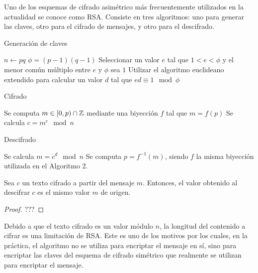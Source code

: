 Uno de los esquemas de cifrado asimétrico más frecuentemente utilizados en la actualidad se conoce como RSA. Consiste en tres algoritmos: uno para generar las claves, otro para el cifrado de mensajes, y otro para el descifrado.

\begin{algorithm}
	\caption{Generación de claves}\label{alg:1}
	$n \gets pq$ 
	$\phi = (p - 1)(q - 1)$\;
	Seleccionar un valor $e$ tal que $1 < e < \phi$ y el menor común múltiplo entre $e$ y $\phi$ sea $1$\;
	Utilizar el algoritmo euclideano extendido para calcular un valor $d$ tal que $ed \equiv 1 \mod \phi$\;
\end{algorithm}

\begin{algorithm}
	\caption{Cifrado}\label{alg:2}
	Se computa $m \in [0, p) \cap \mathbb{Z}$ mediante una biyección $f$ tal que $m = f(p)$\;
	Se calcula $c = m^e \mod n$\;
\end{algorithm}

\begin{algorithm}
	\caption{Descifrado}\label{alg:3}
	Se calcula $m = c^d \mod n$\;
	Se computa $p = f^{-1}(m)$, siendo $f$ la misma biyección utilizada en el Algoritmo 2.
\end{algorithm}

\newpage

\begin{theorem}
	Sea $c$ un texto cifrado a partir del mensaje $m$. Entonces, el valor obtenido al descifrar $c$ es el mismo valor $m$ de origen.
\end{theorem}

\begin{proof}
	???
\end{proof}

Debido a que el texto cifrado es un valor módulo $n$, la longitud del contenido a cifrar es una limitación de RSA. Este es uno de los motivos por los cuales, en la práctica, el algoritmo no se utiliza para encriptar el mensaje en sí, sino para encriptar las claves del esquema de cifrado simétrico que realmente se utilizan para encriptar el mensaje.


